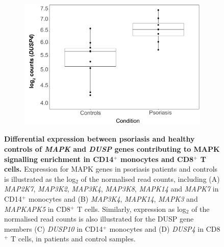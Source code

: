\begin{figure}[htbp]
\begin{subfigure}{0.45\textwidth}
\includegraphics[width=\textwidth]{./Results2/pdfs/RNAseq_PS_CTL_CD8_DUSP4_boxplot}
\caption{\textbf{}}
\end{subfigure}
\caption[Differential expression between psoriasis and healthy controls of \textit{MAPK} and \textit{DUSP} genes contributing to MAPK signalling enrichment in CD14$^+$ monocytes and CD8$^+$ T cells.]{\textbf{Differential expression between psoriasis and healthy controls of \textit{MAPK} and \textit{DUSP} genes contributing to MAPK signalling enrichment in CD14$^+$ monocytes and CD8$^+$ T cells.} Expression for MAPK genes in psoriasis patients and controls is illustrated as the log$_2$ of the normalised read counts, including (A) \textit{MAP2K7}, \textit{MAP3K2}, \textit{MAP3K4}, \textit{MAP3K8}, \textit{MAPK14} and \textit{MAPK7} in CD14$^+$ monocytes and (B) \textit{MAP3K4}, \textit{MAPK14}, \textit{MAPK3} and \textit{MAPKAPK5} in CD8$^+$ T cells. Similarly, expression as log$_2$ of the normalised read counts is also illustrated for the DUSP gene members (C) \textit{DUSP10} in CD14$^+$ monocytes and (D) \textit{DUSP4} in CD8$^+$ T cells, in patients and control samples.}
\label{figure:RNAseq_PS_CTL_MAPK_and_DUSP_genes_boxplots}
\end{figure} 

